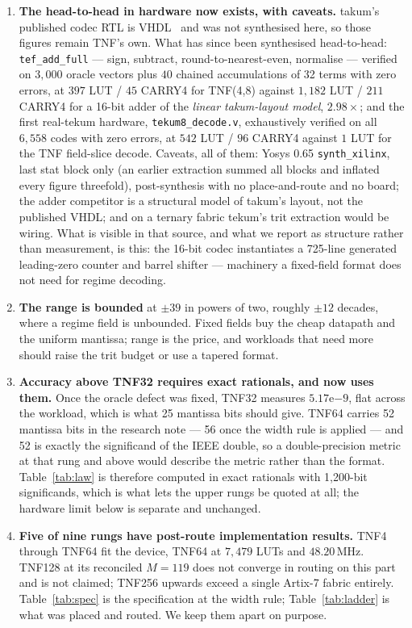 \documentclass[11pt]{article}
\theoremstyle{definition}
\begin{document}
\begin{enumerate}[leftmargin=*]
\item \textbf{The head-to-head in hardware now exists, with caveats.} takum's
published codec RTL is VHDL~\cite{takumrtl} and was not synthesised here, so
those figures remain TNF's own. What has since been synthesised head-to-head:
\texttt{tef\_add\_full} --- sign, subtract, round-to-nearest-even, normalise
--- verified on $3{,}000$ oracle vectors plus $40$ chained accumulations of 32
terms with zero errors, at $397$ LUT / $45$ CARRY4 for TNF(4,8) against
$1{,}182$ LUT / $211$ CARRY4 for a 16-bit adder of the \emph{linear
takum-layout model}, $2.98\times$; and the first real-tekum hardware,
\texttt{tekum8\_decode.v}, exhaustively verified on all $6{,}558$ codes with
zero errors, at $542$ LUT / $96$ CARRY4 against $1$ LUT for the TNF
field-slice decode. Caveats, all of them: Yosys 0.65 \texttt{synth\_xilinx},
last stat block only (an earlier extraction summed all blocks and inflated
every figure threefold), post-synthesis with no place-and-route and no board;
the adder competitor is a structural model of takum's layout, not the
published VHDL; and on a ternary fabric tekum's trit extraction would be
wiring. What is visible in that source, and what we report as structure
rather than measurement, is this: the 16-bit codec instantiates a 725-line
generated leading-zero counter and barrel shifter --- machinery a fixed-field
format does not need for regime decoding.

\item \textbf{The range is bounded} at $\pm39$ in powers of two, roughly $\pm12$
decades, where a regime field is unbounded. Fixed fields buy the cheap datapath
and the uniform mantissa; range is the price, and workloads that need more should
raise the trit budget or use a tapered format.

\item \textbf{Accuracy above TNF32 requires exact rationals, and now uses them.}
Once the oracle defect was fixed, TNF32 measures $5.17\mathrm{e}{-9}$, flat
across the workload, which is what 25 mantissa bits should give. TNF64 carries
52 mantissa bits in the research note --- 56 once the width rule is applied ---
and 52 is exactly the significand of the IEEE double, so a double-precision
metric at that rung and above would describe the metric rather than the format.
Table~\ref{tab:law} is therefore computed in exact rationals with 1{,}200-bit
significands, which is what lets the upper rungs be quoted at all; the hardware
limit below is separate and unchanged.

\item \textbf{Five of nine rungs have post-route implementation results.} TNF4 through TNF64 fit
the device, TNF64 at $7{,}479$ LUTs and $48.20$\,MHz. TNF128 at its reconciled
$M = 119$ does not
converge in routing on this part and is not claimed; TNF256 upwards exceed a
single Artix-7 fabric entirely. Table~\ref{tab:spec} is the specification at the
width rule; Table~\ref{tab:ladder} is what was placed and routed. We keep them
apart on purpose.


\end{enumerate}
\end{document}
